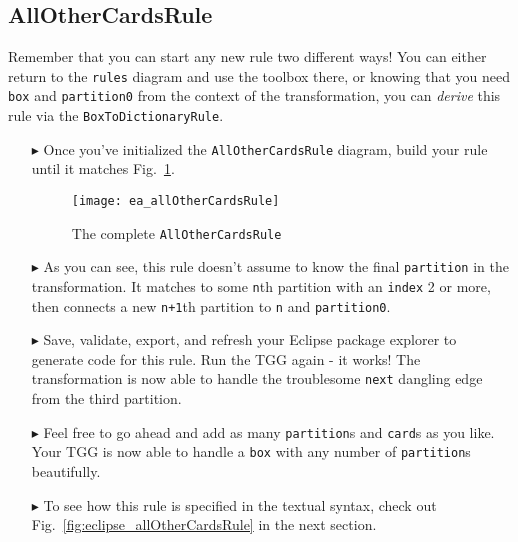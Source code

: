 \newpage
\hypertarget{allCards vis}{}
\subsection{AllOtherCardsRule}
\visHeader

Remember that you can start any new rule two different ways! You can either return to the \texttt{rules} diagram and use the toolbox
there, or knowing that you need \texttt{box} and \texttt{partition0} from the context of the transformation, you can \emph{derive} this rule via the
\texttt{BoxToDictionaryRule}.

\begin{itemize}

\item[$\blacktriangleright$] Once you've initialized the \texttt{AllOtherCardsRule} diagram, build your rule until it matches
Fig.~\ref{fig:ea_allOtherCardsRule}.

\begin{figure}[htbp]
\begin{center}
  \texttt{[image: ea\_allOtherCardsRule]}
  \caption{The complete \texttt{AllOtherCardsRule}}
  \label{fig:ea_allOtherCardsRule}
\end{center}
\end{figure}

\item[$\blacktriangleright$] As you can see, this rule doesn't assume to know the final \texttt{partition} in the transformation. It matches to some
\texttt{n}th partition with an \texttt{index} 2 or more, then connects a new \texttt{n+1}th partition to \texttt{n} and \texttt{partition0}. 

\item[$\blacktriangleright$] Save, validate, export, and refresh your Eclipse package explorer to generate code for this rule. Run the TGG again - it works! The
transformation is now able to handle the troublesome \texttt{next} dangling edge from the third partition.

\item[$\blacktriangleright$] Feel free to go ahead and add as many \texttt{partition}s and \texttt{card}s as you like. Your TGG is now able to handle a
\texttt{box} with any number of \texttt{partition}s beautifully. 

\item[$\blacktriangleright$] To see how this rule is specified in the textual syntax, check out Fig.~\ref{fig:eclipse_allOtherCardsRule} in the next section.

\end{itemize}
